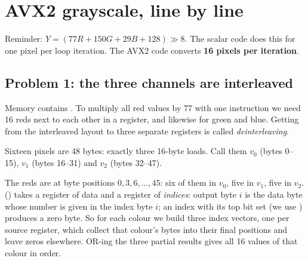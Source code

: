 \chapter{AVX2 grayscale, line by line}\label{ch:gray}

Reminder: $Y=(77R+150G+29B+128)\gg8$. The scalar code does this for one pixel per loop iteration. The AVX2 code converts \textbf{16 pixels per iteration}.

\section{Problem 1: the three channels are interleaved}

Memory contains . To multiply all red values by 77 with one instruction we need 16 reds next to each other in a register, and likewise for green and blue. Getting from the interleaved layout to three separate registers is called \emph{deinterleaving}.

Sixteen pixels are 48 bytes: exactly three 16-byte loads. Call them $v_0$ (bytes 0--15), $v_1$ (bytes 16--31) and $v_2$ (bytes 32--47).

\begin{center}
\end{center}

The reds are at byte positions $0,3,6,\dots,45$: six of them in $v_0$, five in $v_1$, five in $v_2$.  () takes a register of data and a register of \emph{indices}: output byte $i$ is the data byte whose number is given in the index byte $i$; an index with its top bit set (we use ) produces a zero byte. So for each colour we build three index vectors, one per source register, which collect that colour's bytes into their final positions and leave zeros elsewhere. OR-ing the three partial results gives all 16 values of that colour in order.

